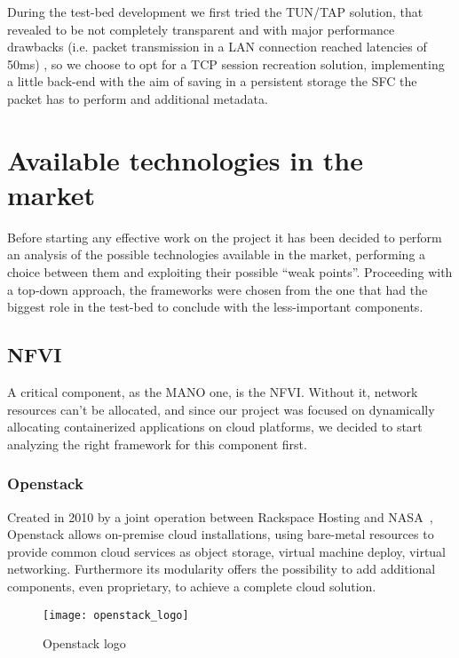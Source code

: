 During the test-bed development we first tried the TUN/TAP solution, that
revealed to be not completely transparent and with major performance drawbacks
(i.e. packet transmission in a LAN connection reached latencies of 50ms)
, so we choose to opt for a TCP session recreation solution,
implementing a little back-end with the aim of saving in a persistent storage
the SFC the packet has to perform and additional metadata.

\section{Available technologies in the market}
\label{chap:prjan:sec:tech}

Before starting any effective work on the project it has been decided to 
perform an analysis of the possible technologies available in the market, 
performing a choice between them and exploiting their possible ``weak 
points''. Proceeding with a top-down approach, the frameworks were chosen from 
the one that had the biggest role in the test-bed to conclude with the 
less-important components.

\subsection{NFVI}

A critical component, as the MANO one, is the NFVI. Without it, network 
resources can't be allocated, and since our project was focused on dynamically 
allocating containerized applications on cloud platforms, we decided to start 
analyzing the right framework for this component first.

\subsubsection{Openstack}
\label{chap:prjan:sec:openstack}
Created in 2010 by a joint operation between Rackspace Hosting and
NASA~\cite{openstackWebsite}, Openstack allows on-premise cloud installations,
using bare-metal resources to provide common cloud services as object storage,
virtual machine deploy, virtual networking. Furthermore its modularity offers
the possibility to add additional components, even proprietary, to achieve a
complete cloud solution.
\begin{figure}[t]
 \centering \texttt{[image: openstack\_logo]}
 \caption{Openstack logo}
 \label{chap:prjan:img:openstack_logo}
\end{figure}


